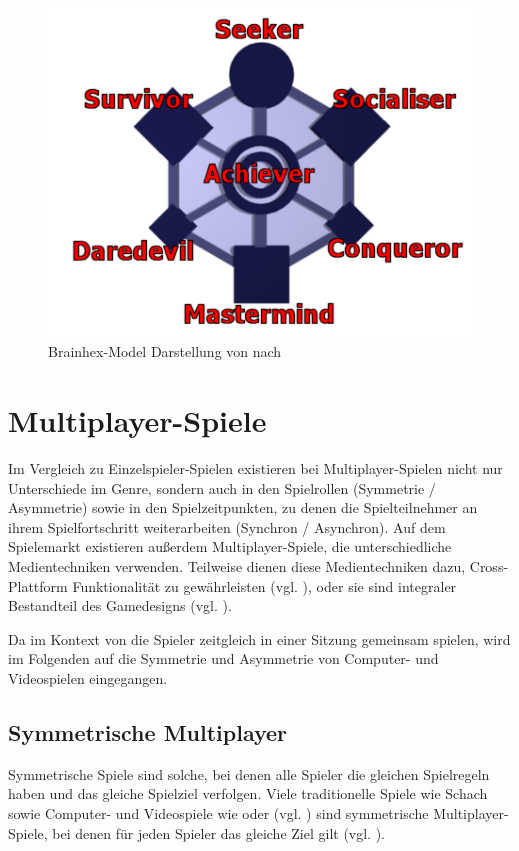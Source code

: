 \begin{figure}[ht]
\centering
\includegraphics[width=1\linewidth]{content/pictures/brainhex-classes.png}
\caption{Brainhex-Model Darstellung von \citealp{pixel_ninja_i_2015} nach \citealp{nacke_brainhex_2013}}
\label{fig:brain-hex}
\end{figure}

\section{Multiplayer-Spiele}
Im Vergleich zu Einzelspieler-Spielen existieren bei Multiplayer-Spielen nicht nur Unterschiede im Genre, sondern auch in den Spielrollen (Symmetrie / Asymmetrie) sowie in den Spielzeitpunkten, zu denen die Spielteilnehmer an ihrem Spielfortschritt weiterarbeiten (Synchron / Asynchron). Auf dem Spielemarkt existieren außerdem Multiplayer-Spiele, die unterschiedliche Medientechniken verwenden. Teilweise dienen diese Medientechniken dazu, Cross-Plattform Funktionalität zu gewährleisten (vgl. \citealp{larian_studios_baldurs_2023}), oder sie sind integraler Bestandteil des Gamedesigns (vgl. \citealp{steel_crate_games_keep_2015}).

Da im Kontext von  die Spieler zeitgleich in einer Sitzung gemeinsam spielen, wird im Folgenden auf die Symmetrie und Asymmetrie von Computer- und Videospielen eingegangen.

\subsection{Symmetrische Multiplayer}
Symmetrische Spiele sind solche, bei denen alle Spieler die gleichen Spielregeln haben und das gleiche Spielziel verfolgen. Viele traditionelle Spiele wie Schach sowie Computer- und Videospiele wie  oder  (vgl. \citealp{nintendo_mario_1992, mojang_willkommen_2009}) sind symmetrische Multiplayer-Spiele, bei denen für jeden Spieler das gleiche Ziel gilt (vgl. \citealp[S. 12]{adams_fundamentals_2009}).

